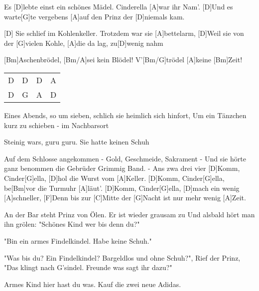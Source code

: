 

\begin{guitar}
	Es [D]lebte einst ein schönes Mädel. Cinderella [A]war ihr Nam'.
	[D]Und es warte[G]te vergebens [A]auf den Prinz der [D]niemals kam.
	
	[D] Sie schlief im Kohlenkeller. Trotzdem war sie [A]bettelarm,
	[D]Weil sie von der [G]vielen Kohle, [A]die da lag, zu[D]wenig nahm
	
	[Bm]Aschenbrödel, [Bm/A]sei kein Blödel! V'[Bm/G]trödel [A]keine [Bm]Zeit!\vspace{-0.3em}
	
	 {\footnotesize\begin{tabular}{l|l|l|l}
			D & D & D & A \\
			D & G & A & D 
	\end{tabular}}
	Eines Abends, so um sieben, schlich sie heimlich sich hinfort,
	Um ein Tänzchen kurz zu schieben - im Nachbarsort
	
	Steinig wars, guru guru. Sie hatte keinen Schuh
	
	Auf dem Schlosse angekommen - Gold, Geschmeide, Sakrament -
	Und sie hörte ganz benommen die Gebrüder Grimmig Band. 
	\hfill- Ans zwa drei vier\vspace{-0.5em}
	[D]Komm, Cinder[G]ella, [D]hol die Wurst vom [A]Keller. 
	[D]Komm, Cinder[G]ella, be[Bm]vor die Turmuhr [A]läut'.
	[D]Komm, Cinder[G]ella, [D]mach ein wenig [A]schneller, 
	[F]Denn bis zur [C]Mitte der [G]Nacht ist nur mehr wenig [A]Zeit.\vspace{-0.3em}
	
	An der Bar steht Prinz von Ölen. Er ist wieder grausam zu
	Und alsbald hört man ihn grölen: "Schönes Kind wer bis denn du?"
	
	"Bin ein armes Findelkindel. Habe keine Schuh."
	
	"Was bis du? Ein Findelkindel? Bargeldlos und ohne Schuh?",
	Rief der Prinz, "Das klingt nach G'sindel. Freunde was sagt ihr dazu?"
	
	Armes Kind hier hast du was. Kauf die zwei neue Adidas.
	

\end{guitar}
